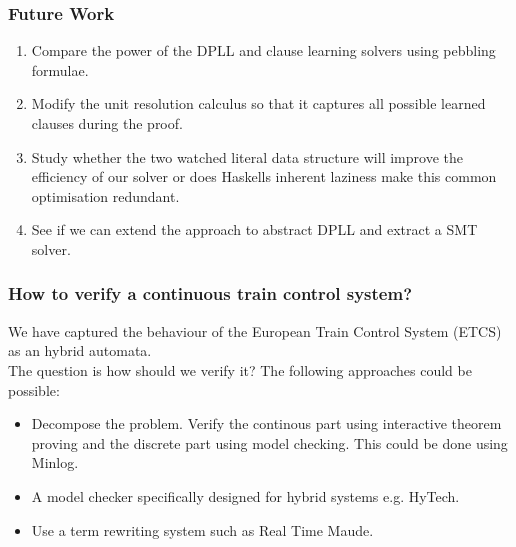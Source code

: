 \documentclass{beamer}
\begin{document}
\begin{comment}
\node[rectangle, fill = yellow, minimum width = 1cm , draw] at (8.5, 0.6) {Interlocking};

\draw[<->, very thick] (8.5 , 0.9) -- (8.5, 1.2);

\node [rectangle, fill = yellow, minimum width = 1cm, draw] at (8.5, 1.4){Radio \hfill Block \hfill Centre};

\draw[<->, very thick, dashed] (7.2 , 1.4) -- (5, 0.7) node [above = 5pt,midway] {via Radio};




\end{tikzpicture}

\label{fig:ETCSLevel2}
\end{figure}
\end{center}

\end{frame}

\end{comment}


\begin{frame}
\frametitle{Future Work} 
\begin{enumerate}
\item Compare the power of the DPLL and clause learning solvers using pebbling formulae.

\item Modify the unit resolution calculus so that it captures all possible learned clauses during the proof.

\item Study whether the two watched literal data structure will improve the efficiency of our solver or does Haskells inherent laziness make this common optimisation redundant.

\item See if we can extend the approach to abstract DPLL and extract a SMT solver.
\end{enumerate}
\end{frame}

\begin{frame}
\frametitle{How to verify a continuous train control system?}
We have captured the behaviour of the European Train Control System (ETCS) as an hybrid automata.\\

The question is how should we verify it? The following approaches could be possible:

\begin{itemize}

\item Decompose the problem. Verify the continous part using interactive theorem proving and the discrete part using model checking.  This could be done using Minlog.

\item  A model checker specifically designed for hybrid systems e.g. HyTech.

\item Use a term rewriting system such as Real Time Maude.

\end{itemize}
\end{frame}
\end{document}
